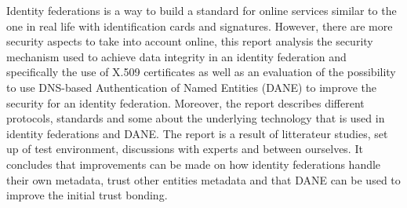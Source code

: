 Identity federations is a way to build a standard for online services similar to the one in real life with identification cards and signatures.
However, there are more security aspects to take into account online, this report analysis the security mechanism used to achieve data integrity in an identity federation and specifically the use of X.509 certificates as well as an evaluation of the possibility to use DNS-based Authentication of Named Entities (DANE) to improve the security for an identity federation.
Moreover, the report describes different protocols, standards and some about the underlying technology that is used in identity federations and DANE. 
The report is a result of litterateur studies, set up of test environment, discussions with experts and between ourselves.
It concludes that improvements can be made on how identity federations handle their own metadata, trust other entities metadata and that DANE can be used to improve the initial trust bonding.





